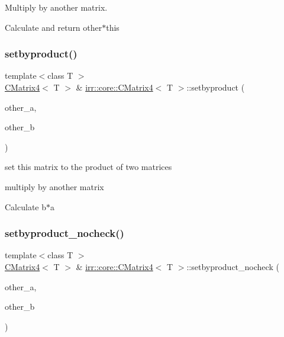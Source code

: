 Multiply by another matrix. 

Calculate and return other$\ast$this \mbox{\label{classirr_1_1core_1_1CMatrix4_a8503c58913ba9407ba00b173d8a3e25c}} 
\subsubsection{\texorpdfstring{setbyproduct()}{setbyproduct()}}
{\footnotesize\ttfamily template$<$class T $>$ \\
\hyperlink{classirr_1_1core_1_1CMatrix4}{C\+Matrix4}$<$ T $>$ \& \hyperlink{classirr_1_1core_1_1CMatrix4}{irr\+::core\+::\+C\+Matrix4}$<$ T $>$\+::setbyproduct (\begin{DoxyParamCaption}\item[{const \hyperlink{classirr_1_1core_1_1CMatrix4}{C\+Matrix4}$<$ T $>$ \&}]{other\+\_\+a,  }\item[{const \hyperlink{classirr_1_1core_1_1CMatrix4}{C\+Matrix4}$<$ T $>$ \&}]{other\+\_\+b }\end{DoxyParamCaption})\hspace{0.3cm}{\ttfamily [inline]}}



set this matrix to the product of two matrices 

multiply by another matrix

Calculate b$\ast$a \mbox{\label{classirr_1_1core_1_1CMatrix4_a526a2a11dcd8b18c9e77deb84094778d}} 
\subsubsection{\texorpdfstring{setbyproduct\+\_\+nocheck()}{setbyproduct\_nocheck()}}
{\footnotesize\ttfamily template$<$class T $>$ \\
\hyperlink{classirr_1_1core_1_1CMatrix4}{C\+Matrix4}$<$ T $>$ \& \hyperlink{classirr_1_1core_1_1CMatrix4}{irr\+::core\+::\+C\+Matrix4}$<$ T $>$\+::setbyproduct\+\_\+nocheck (\begin{DoxyParamCaption}\item[{const \hyperlink{classirr_1_1core_1_1CMatrix4}{C\+Matrix4}$<$ T $>$ \&}]{other\+\_\+a,  }\item[{const \hyperlink{classirr_1_1core_1_1CMatrix4}{C\+Matrix4}$<$ T $>$ \&}]{other\+\_\+b }\end{DoxyParamCaption})\hspace{0.3cm}{\ttfamily [inline]}}



